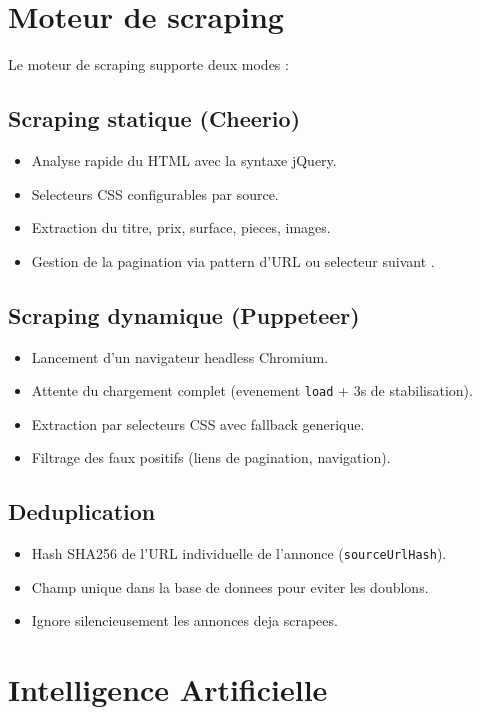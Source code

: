 \documentclass[12pt,a4paper]{report}
\begin{document}
\section{Moteur de scraping}

Le moteur de scraping supporte deux modes :

\subsection{Scraping statique (Cheerio)}
\begin{itemize}
  \item Analyse rapide du HTML avec la syntaxe jQuery.
  \item Selecteurs CSS configurables par source.
  \item Extraction du titre, prix, surface, pieces, images.
  \item Gestion de la pagination via pattern d'URL ou selecteur \guillemotleft{} suivant \guillemotright{}.
\end{itemize}

\subsection{Scraping dynamique (Puppeteer)}
\begin{itemize}
  \item Lancement d'un navigateur headless Chromium.
  \item Attente du chargement complet (evenement \texttt{load} + 3s de stabilisation).
  \item Extraction par selecteurs CSS avec fallback generique.
  \item Filtrage des faux positifs (liens de pagination, navigation).
\end{itemize}

\subsection{Deduplication}
\begin{itemize}
  \item Hash SHA256 de l'URL individuelle de l'annonce (\texttt{sourceUrlHash}).
  \item Champ unique dans la base de donnees pour eviter les doublons.
  \item Ignore silencieusement les annonces deja scrapees.
\end{itemize}

\section{Intelligence Artificielle}
\end{document}
